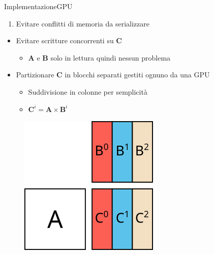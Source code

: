 \documentclass{beamer}
\begin{document}
\begin{frame}{Implementazione}{GPU}
    \begin{enumerate}
        \item Evitare conflitti di memoria da serializzare
    \end{enumerate}
    \medskip

    \begin{itemize}
        \item Evitare scritture concorrenti su $\mathbf{C}$
              \begin{itemize}
                  \item $\mathbf{A}$ e $\mathbf{B}$ solo in lettura quindi nessun problema
              \end{itemize}
        \item Partizionare $\mathbf{C}$ in blocchi separati gestiti ognuno da una GPU
              \begin{itemize}
                  \item Suddivisione in colonne per semplicità
                  \item $\mathbf{C}^i = \mathbf{A} \times  \mathbf{B}^i$
              \end{itemize}
    \end{itemize}

    \begin{figure}[h]
        \includegraphics[width=0.25\linewidth]{imgs/gpu.png}
    \end{figure}
\end{frame}
\end{document}
